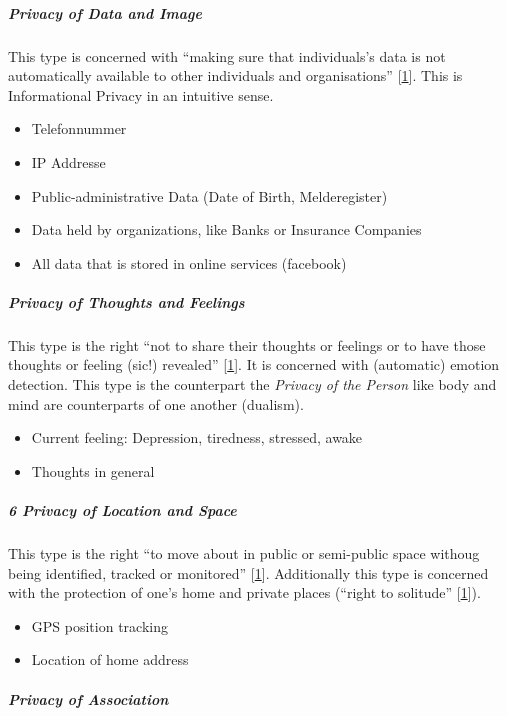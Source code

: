 \subparagraph{Privacy of Data and Image}

This type is concerned with ``making sure that individuals's data is not
automatically available to other individuals and organisations''
{[}\hyperref[references]{1}{]}. This is Informational Privacy in an
intuitive sense.

\begin{itemize}
\itemsep1pt\parskip0pt
\item
  Telefonnummer
\item
  IP Addresse
\item
  Public-administrative Data (Date of Birth, Melderegister)
\item
  Data held by organizations, like Banks or Insurance Companies
\item
  All data that is stored in online services (facebook)
\end{itemize}

\subparagraph{Privacy of Thoughts and Feelings}

This type is the right ``not to share their thoughts or feelings or to
have those thoughts or feeling (sic!) revealed''
{[}\hyperref[references]{1}{]}. It is concerned with (automatic) emotion
detection. This type is the counterpart the \emph{Privacy of the Person}
like body and mind are counterparts of one another (dualism).

\begin{itemize}
\itemsep1pt\parskip0pt
\item
  Current feeling: Depression, tiredness, stressed, awake
\item
  Thoughts in general
\end{itemize}

\subparagraph{6 Privacy of Location and Space}

This type is the right ``to move about in public or semi-public space
withoug being identified, tracked or monitored''
{[}\hyperref[references]{1}{]}. Additionally this type is concerned with
the protection of one's home and private places (``right to solitude''
{[}\hyperref[references]{1}{]}).

\begin{itemize}
\itemsep1pt\parskip0pt
\item
  GPS position tracking
\item
  Location of home address
\end{itemize}

\subparagraph{Privacy of Association}

